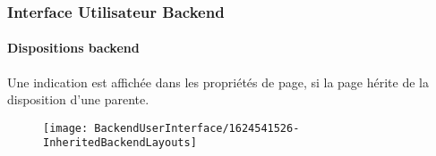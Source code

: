 %

\begin{frame}[fragile]
	\frametitle{Interface Utilisateur Backend}
	\framesubtitle{Dispositions backend}

    Une indication est affichée dans les propriétés de page, si la page hérite de
    la disposition d'une parente.

	\begin{figure}
		\texttt{[image: BackendUserInterface/1624541526-InheritedBackendLayouts]}
	\end{figure}

\end{frame}

